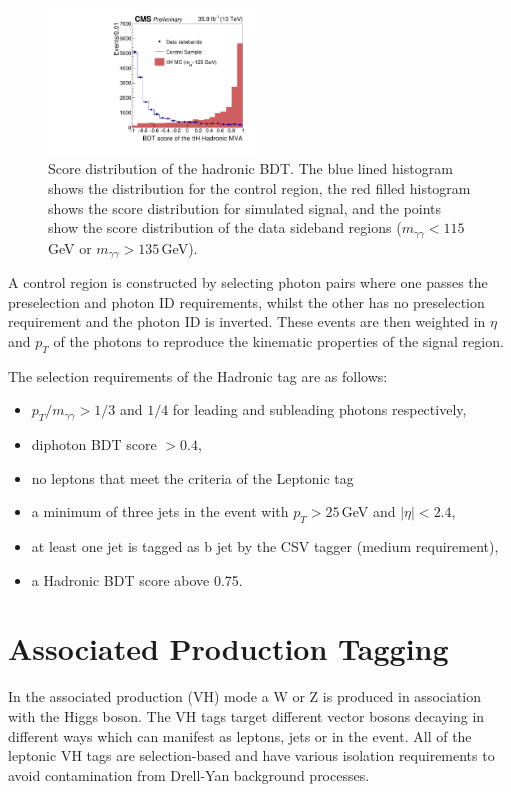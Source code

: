 \begin{figure}[h!]
    \includegraphics[width=0.49\textwidth]{figures/event_selection/Figure_006.pdf}
    \caption{Score distribution of the hadronic \ttH BDT. The blue lined histogram shows the distribution for the control region, the red filled histogram shows the score distribution for simulated signal, and the points show the score distribution of the data sideband regions ($m_{\gamma\gamma} < 115$\,GeV or $m_{\gamma\gamma} > 135$\,GeV).}
        \label{fig:event_categorisaton:tth_hadronic_bdt}
\end{figure}

A control region is constructed by selecting photon pairs where one passes the preselection and photon ID requirements, whilst the other has no preselection requirement and the photon ID is inverted.
These events are then weighted in $\eta$ and $p_T$ of the photons to reproduce the kinematic properties of the signal region.

The selection requirements of the \ttH Hadronic tag are as follows:
\begin{itemize}[leftmargin=.5in,noitemsep]
    \item $p_{T}/m_{\gamma\gamma} > 1/3$ and $1/4$ for leading and subleading photons respectively,
    \item diphoton BDT score $> 0.4$,
    \item no leptons that meet the criteria of the \ttH Leptonic tag
    \item a minimum of three jets in the event with $p_{T} > 25$\,GeV and $|\eta| < 2.4$,
    \item at least one jet is tagged as b jet by the CSV tagger (medium requirement),
    \item a \ttH Hadronic BDT score above 0.75.
\end{itemize}



\section{Associated Production Tagging}
In the associated production (VH) mode a W or Z is produced in association with the Higgs boson. The VH tags target different vector bosons decaying in different ways which can manifest as leptons, jets or \MET in the event.
All of the leptonic VH tags are selection-based and have various isolation requirements to avoid contamination from Drell-Yan background processes.

